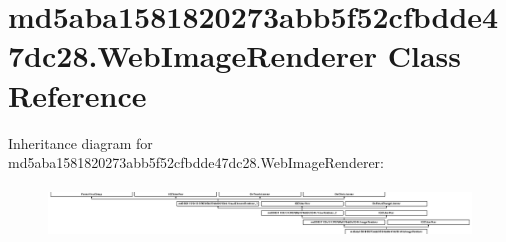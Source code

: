 \hypertarget{classmd5aba1581820273abb5f52cfbdde47dc28_1_1WebImageRenderer}{}\section{md5aba1581820273abb5f52cfbdde47dc28.\+Web\+Image\+Renderer Class Reference}
\label{classmd5aba1581820273abb5f52cfbdde47dc28_1_1WebImageRenderer}
Inheritance diagram for md5aba1581820273abb5f52cfbdde47dc28.\+Web\+Image\+Renderer\+:\begin{figure}[H]
\begin{center}
\leavevmode
\includegraphics[height=1.372549cm]{classmd5aba1581820273abb5f52cfbdde47dc28_1_1WebImageRenderer}
\end{center}
\end{figure}
